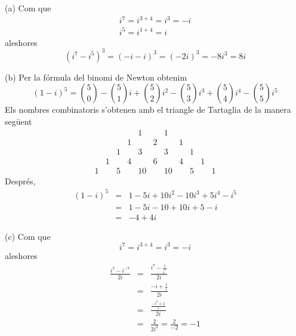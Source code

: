 \begin{solucio}
(a) Com que
\begin{equation*}
\begin{array}{l}
i^{7}=i^{3+4}=i^{3}=-i \\
i^{5}=i^{1+4}=i
\end{array}
\end{equation*}
aleshores
\begin{equation*}
(i^{7}-i^{5})^{3}=(-i-i)^{3}=(-2i)^{3}=-8i^{3}=8i
\end{equation*}

(b) Per la fórmula del binomi de Newton obtenim
\begin{equation*}
(1-i)^{5}=\binom{5}{0}-\binom{5}{1}i+\binom{5}{2}i^{2}-\binom{5}{3}i^{3}+
\binom{5}{4}i^{4}-\binom{5}{5}i^{5}
\end{equation*}
Els nombres combinatoris s’obtenen amb el triangle de Tartaglia
de la manera següent
\begin{equation*}
\begin{array}{lllllllllll}
&  &  &  & 1 &  & 1 &  &  &  &  \\
&  &  & 1 &  & 2 &  & 1 &  &  &  \\
&  & 1 &  & 3 &  & 3 &  & 1 &  &  \\
& 1 &  & 4 &  & 6 &  & 4 &  & 1 &  \\
1 &  & 5 &  & 10 &  & 10 &  & 5 &  & 1
\end{array}
\end{equation*}
Després,
\begin{eqnarray*}
(1-i)^{5} &=&1-5i+10i^{2}-10i^{3}+5i^{4}-i^{5} \\
&=&1-5i-10+10i+5-i \\
&=&-4+4i
\end{eqnarray*}

(c) Com que
\begin{equation*}
i^{7}=i^{3+4}=i^{3}=-i
\end{equation*}
aleshores
\begin{eqnarray*}
\frac{i^{7}-i^{-7}}{2i} &=&\frac{i^{7}-\frac{1}{i^{7}}}{2i} \\
&=&\frac{-i+\frac{1}{i}}{2i} \\
&=&\frac{\frac{-i^{2}+1}{i}}{2i} \\
&=&\frac{2}{2i^{2}}=\frac{2}{-2}=-1
\end{eqnarray*}


\end{solucio}
